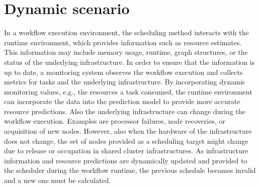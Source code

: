 \documentclass[conference]{IEEEtran}
\newcommand{\AB}[1]{{\color{purple}[AB: #1]}}
\begin{document}
%
%
%
%
%
%



\section{Dynamic scenario}
\label{sec:dyn}


    In a workflow execution environment, the scheduling method interacts with the runtime environment, which provides information such as resource estimates.
    This information may include memory usage, runtime, graph structures, or the status of the underlying infrastructure.
    In order to ensure that the information is up to date, a monitoring system observes the workflow execution and collects metrics for tasks and the underlying infrastructure.
    By incorporating dynamic monitoring values, e.g., the resources a task consumed, the runtime environment can incorporate the data into the prediction model to provide more accurate resource predictions.
    Also the underlying infrastructure can change during the workflow execution.
    Examples are processor failures, node recoveries, or acquisition of new nodes.
    However, also when the hardware of the infrastructure does not change, the set of nodes provided as a scheduling target might change due to release or occupation in shared cluster infrastructures.
    As infrastructure information and resource predictions are dynamically updated and provided to the scheduler during the workflow runtime, the previous schedule becomes invalid and a new one must be calculated.
\end{document}
